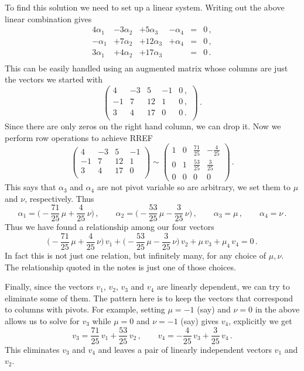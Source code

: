 {To find this solution we need to set up a linear system. Writing out the above linear combination gives 
\[
\begin{array}{cccccc}
4\alpha_1&-3\alpha_2&+5\alpha_3&-\alpha_4 &=&0\, ,\\
-\alpha_1&+7\alpha_2&+12\alpha_3&+\alpha_4 &=&0\, ,\\
3\alpha_1&+4\alpha_2&+17\alpha_3& &=&0\, .\\
\end{array}
\]
This can be easily handled using an augmented matrix whose columns are just the vectors we started with
\[
\left(
\begin{array}{cccc|c}
4&-3&5&-1 &0\, ,\\
-1&7&12&1 &0\, ,\\
3&4&17& 0&0\, .\\
\end{array}\right)\, .
\]
Since there are only zeros on the right hand column, we can drop it. Now we perform row operations to achieve RREF
\[
\begin{pmatrix}
4&-3&5&-1 \\
-1&7&12&1 \\
3&4&17& 0\\
\end{pmatrix}\sim
\begin{pmatrix}
1 & 0 & \frac{71}{25}& -\frac 4{25}\\[1mm]
0&1&\frac{53}{25}&\frac 3{25}\\[1mm]
0&0&0&0
\end{pmatrix}\, .
\]
This says that $\alpha_3$ and $\alpha_4$ are not pivot variable so are arbitrary, we set them to $\mu$ and $\nu$, respectively.
Thus
\[
\alpha_1=\Big(-\frac{71}{25}\, \mu+\frac4{25}\, \nu\Big)\, ,\qquad \alpha_2=\Big(-\frac{53}{25}\, \mu-\frac{3}{25}\, \nu\Big)\, ,\qquad
\alpha_3=\mu\, ,\qquad \alpha_4= \nu\, .
\]
Thus we have found a relationship among our four vectors
\[
\Big(-\frac{71}{25}\, \mu+\frac4{25}\, \nu\Big)\, v_1+\Big(-\frac{53}{25}\, \mu-\frac{3}{25}\, \nu\Big)\, v_2
+\mu\,  v_3+ \mu_4\,  v_4=0\, .
\]
In fact this is not just one relation, but infinitely many, for any choice of $\mu,\nu$. 
The relationship quoted in the notes is just one of those choices.

Finally, since the vectors $v_1$, $v_2$, $v_3$ and $v_4$ are linearly dependent, we can try to eliminate some of them.
The pattern here is to keep the vectors that correspond to columns with pivots. For example, setting $\mu=-1$ (say) and $\nu=0$ 
in the above allows us to solve for $v_3$ while $\mu=0$ and $\nu=-1$ (say) gives $v_4$, explicitly we get
\[
v_3=\frac{71}{25}\,  v_1 + \frac{53}{25}\, v_2\, ,\qquad 
v_4=-\frac{4}{25}\, v_3 + \frac 3{25} \, v_4\, .
\]
This eliminates $v_3$ and $v_4$ and leaves a pair of linearly independent vectors $v_1$ and $v_2$.




} %

